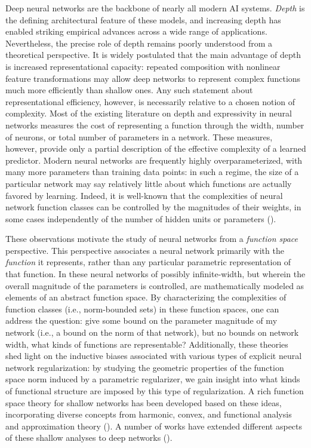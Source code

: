 \documentclass{article}
\begin{document}
Deep neural networks are the backbone of nearly all modern AI systems. \textit{Depth} is the defining architectural feature of these models, and increasing depth has enabled striking empirical advances across a wide range of applications. Nevertheless, the precise role of depth remains poorly understood from a theoretical perspective. It is widely postulated that the main advantage of depth is increased representational capacity: repeated composition with nonlinear feature transformations may allow deep networks to represent complex functions much more efficiently than shallow ones. Any such statement about representational efficiency, however, is necessarily relative to a chosen notion of complexity. Most of the existing literature on depth and expressivity in neural networks measures the cost of representing a function through the width, number of neurons, or total number of parameters in a network. These measures, however, provide only a partial description of the effective complexity of a learned predictor. Modern neural networks are frequently highly overparameterized, with many more parameters than training data points: in such a regime, the size of a particular network may say relatively little about which functions are actually favored by learning. Indeed, it is well-known that the complexities of neural network function classes can be controlled by the magnitudes of their weights, in some cases independently of the number of hidden units or parameters (\cite{bartlett1996valid,neyshabur2015norm,golowich2018size,barron2019complexity}).

These observations motivate the study of neural networks from a \textit{function space} perspective. This perspective associates a neural network primarily with the \textit{function} it represents, rather than any particular parametric representation of that function. In these neural networks of possibly infinite-width, but wherein the overall magnitude of the parameters is controlled, are mathematically modeled as elements of an abstract function space. By characterizing the complexities of function classes (i.e., norm-bounded sets) in these function spaces, one can address the question: give some bound on the parameter magnitude of my network (i.e., a bound on the norm of that network), but no bounds on network width, what kinds of functions are representable? Additionally, these theories shed light on the inductive biases associated with various types of explicit neural network regularization: by studying the geometric properties of the function space norm induced by a parametric regularizer, we gain insight into what kinds of functional structure are imposed by this type of regularization. A rich function space theory for shallow networks has been developed based on these ideas, incorporating diverse concepts from harmonic, convex, and functional analysis and approximation theory (\cite{bach2017breaking,ongie2019function,parhi2021banach,parhi2022near,ma2022barron,wojtowytsch2022representation,bartolucci2023understanding,siegel2023characterization,siegel2024sharp}). A number of works have extended different aspects of these shallow analyses to deep networks (\cite{wojtowytsch2020banach,parhi2022kinds,shenouda2024variation, bartolucci2024neural,heeringa2025deep,ongie2026representation}). 
\end{document}
